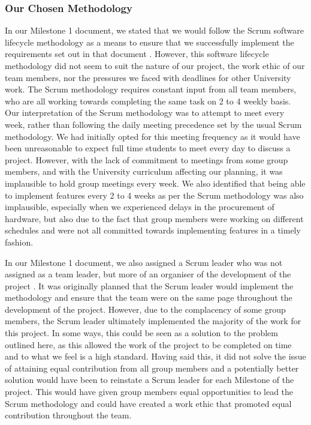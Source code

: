             \subsubsection{Our Chosen Methodology}

                In our Milestone 1 document, we stated that we would follow the Scrum software lifecycle methodology as a means to ensure that we successfully implement the requirements set out in that document \cite{coaker}. However, this software lifecycle methodology did not seem to suit the nature of our project, the work ethic of our team members, nor the pressures we faced with deadlines for other University work. The Scrum methodology requires constant input from all team members, who are all working towards completing the same task on 2 to 4 weekly basis. Our interpretation of the Scrum methodology was to attempt to meet every week, rather than following the daily meeting precedence set by the usual Scrum methodology. We had initially opted for this meeting frequency as it would have been unreasonable to expect full time students to meet every day to discuss a project. However, with the lack of commitment to meetings from some group members, and with the University curriculum affecting our planning, it was implausible to hold group meetings every week. We also identified that being able to implement features every 2 to 4 weeks as per the Scrum methodology was also implausible, especially when we experienced delays in the procurement of hardware, but also due to the fact that group members were working on different schedules and were not all committed towards implementing features in a timely fashion.

                In our Milestone 1 document, we also assigned a Scrum leader who was not assigned as a team leader, but more of an organiser of the development of the project \cite{coaker}. It was originally planned that the Scrum leader would implement the methodology and ensure that the team were on the same page throughout the development of the project. However, due to the complacency of some group members, the Scrum leader ultimately implemented the majority of the work for this project. In some ways, this could be seen as a solution to the problem outlined here, as this allowed the work of the project to be completed on time and to what we feel is a high standard. Having said this, it did not solve the issue of attaining equal contribution from all group members and a potentially better solution would have been to reinstate a Scrum leader for each Milestone of the project. This would have given group members equal opportunities to lead the Scrum methodology and could have created a work ethic that promoted equal contribution throughout the team.

